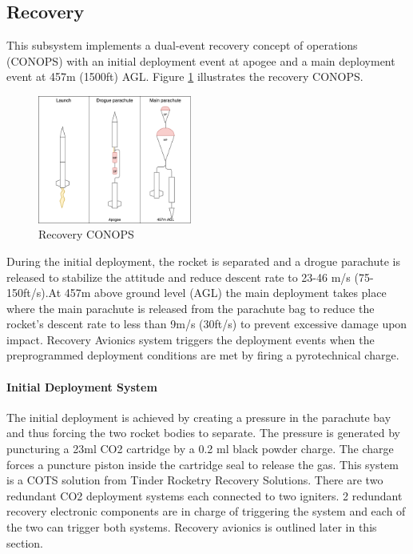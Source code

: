 \subsection{Recovery}
This subsystem implements a dual-event recovery concept of operations (CONOPS) with an initial deployment event at apogee and a main deployment event at 457m (1500ft) AGL. Figure \ref{f:recovery_conops} illustrates the recovery CONOPS.
\begin{figure}[h!]
 	\centering
        \includegraphics[width=0.45\textwidth]{img/recovery_conops_schema.png}
        \caption{Recovery CONOPS}
        \label{f:recovery_conops}
 \end{figure}

During the initial deployment, the rocket is separated and a drogue parachute is released to stabilize the attitude and reduce descent rate to 23-46 m/s (75-150ft/s).At 457m above ground level (AGL) the main deployment takes place where the main parachute is released from the parachute bag to reduce the rocket's descent rate to less than 9m/s (30ft/s) to prevent excessive damage upon impact. Recovery Avionics system triggers the deployment events when the preprogrammed deployment conditions are met by firing a pyrotechnical charge.

\paragraph{Initial Deployment System}
\hfill \break
The initial deployment is achieved by creating a pressure in the parachute bay and thus forcing the two rocket bodies to separate. The pressure is generated by puncturing a 23ml CO2 cartridge by a 0.2 ml black powder charge. The charge forces a puncture piston inside the cartridge seal to release the gas. This system is a COTS solution from Tinder Rocketry Recovery Solutions.
There are two redundant CO2 deployment systems each connected to two igniters. 2 redundant recovery electronic components are in charge of triggering the system and each of the two can trigger both systems. Recovery avionics is outlined later in this section.

